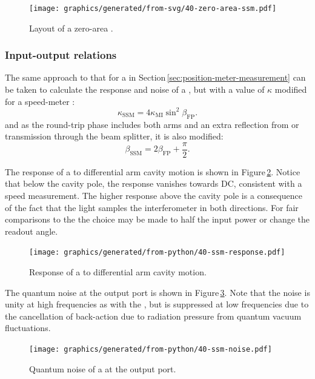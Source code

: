 \begin{figure}
  \centering
  \texttt{[image: graphics/generated/from-svg/40-zero-area-ssm.pdf]}
  \caption[Layout of a zero-area \SSM{}]{\label{fig:zero-area-ssm}Layout of a zero-area \SSM{}.}
\end{figure} 

\subsubsection{Input-output relations}
The same approach to that for a \FPMI{} in Section\,\ref{sec:position-meter-measurement} can be taken to calculate the response and noise of a \SM{}, but with a value of $\kappa$ modified for a speed-meter \cite{Chen2003}:
\begin{equation}
  \kappa_{\text{SSM}} = 4 \kappa_{\text{MI}} \sin^2 \beta_{\text{FP}}.
\end{equation}
and as the round-trip phase includes both arms and an extra reflection from or transmission through the beam splitter, it is also modified:
\begin{equation}
  \beta_{\text{SSM}} = 2 \beta_{\text{FP}} + \frac{\pi}{2}.
\end{equation}

The response of a \SSM{} to differential arm cavity motion is shown in Figure\,\ref{fig:ssm-response}. Notice that below the cavity pole, the response vanishes towards \gls{DC}, consistent with a speed measurement. The higher response above the cavity pole is a consequence of the fact that the light samples the interferometer in both directions. For fair comparisons to the \MI{} the choice may be made to half the input power or change the readout angle.

\begin{figure}
  \centering
  \texttt{[image: graphics/generated/from-python/40-ssm-response.pdf]}
  \caption[Response of a \SSM{} to differential arm cavity motion]{\label{fig:ssm-response}Response of a \SSM{} to differential arm cavity motion.}
\end{figure}

The quantum noise at the output port is shown in Figure\,\ref{fig:ssm-noise}. Note that the noise is unity at high frequencies as with the \FPMI{}, but is suppressed at low frequencies due to the cancellation of back-action due to radiation pressure from quantum vacuum fluctuations.

\begin{figure}
  \centering
  \texttt{[image: graphics/generated/from-python/40-ssm-noise.pdf]}
  \caption[Quantum noise of a \SSM{} at the output port]{\label{fig:ssm-noise}Quantum noise of a \SSM{} at the output port.}
\end{figure}

